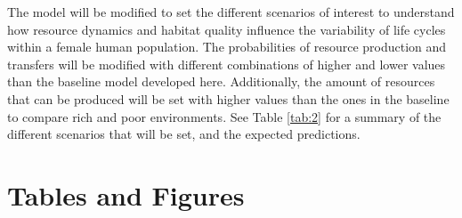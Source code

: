 \documentclass{article}
\begin{document}
The model will be modified to set the different scenarios of interest to understand how resource dynamics and habitat quality influence the variability of life cycles within a female human population. The probabilities of resource production and transfers will be modified with different combinations of higher and lower values than the baseline model developed here. Additionally, the amount of resources that can be produced will be set with higher values than the ones in the baseline to compare rich and poor environments. See Table \ref{tab:2} for a summary of the different scenarios that will be set, and the expected predictions.

\section{Tables and Figures}
\end{document}
